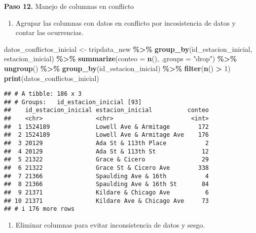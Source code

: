 \documentclass[
]{article}
\newenvironment{Shaded}{\begin{snugshade}}{\end{snugshade}}
\newcommand{\AttributeTok}[1]{\textcolor[rgb]{0.13,0.29,0.53}{#1}}
\newcommand{\DecValTok}[1]{\textcolor[rgb]{0.00,0.00,0.81}{#1}}
\newcommand{\FunctionTok}[1]{\textcolor[rgb]{0.13,0.29,0.53}{\textbf{#1}}}
\newcommand{\NormalTok}[1]{#1}
\newcommand{\OtherTok}[1]{\textcolor[rgb]{0.56,0.35,0.01}{#1}}
\newcommand{\SpecialCharTok}[1]{\textcolor[rgb]{0.81,0.36,0.00}{\textbf{#1}}}
\newcommand{\StringTok}[1]{\textcolor[rgb]{0.31,0.60,0.02}{#1}}
\providecommand{\tightlist}{%
  \setlength{\itemsep}{0pt}\setlength{\parskip}{0pt}}
\begin{document}
\hfill\break
\textbf{Paso 12.} Manejo de columnas en conflicto

\begin{enumerate}
\def\labelenumi{\arabic{enumi}.}
\tightlist
\item
  Agrupar las columnas con datos en conflicto por incosistencia de datos
  y contar las ocurrencias.
\end{enumerate}

\begin{Shaded}
\begin{Highlighting}[]
\NormalTok{    datos\_conflictos\_inicial }\OtherTok{\textless{}{-}}\NormalTok{ tripdata\_new }\SpecialCharTok{\%\textgreater{}\%}
      \FunctionTok{group\_by}\NormalTok{(id\_estacion\_inicial, estacion\_inicial) }\SpecialCharTok{\%\textgreater{}\%}
      \FunctionTok{summarize}\NormalTok{(}\AttributeTok{conteo =} \FunctionTok{n}\NormalTok{(), }\AttributeTok{.groups =} \StringTok{"drop"}\NormalTok{) }\SpecialCharTok{\%\textgreater{}\%}
      \FunctionTok{ungroup}\NormalTok{() }\SpecialCharTok{\%\textgreater{}\%} \FunctionTok{group\_by}\NormalTok{(id\_estacion\_inicial) }\SpecialCharTok{\%\textgreater{}\%}
      \FunctionTok{filter}\NormalTok{(}\FunctionTok{n}\NormalTok{() }\SpecialCharTok{\textgreater{}} \DecValTok{1}\NormalTok{) }
    \FunctionTok{print}\NormalTok{(datos\_conflictos\_inicial)}
\end{Highlighting}
\end{Shaded}

\begin{verbatim}
## # A tibble: 186 x 3
## # Groups:   id_estacion_inicial [93]
##    id_estacion_inicial estacion_inicial          conteo
##    <chr>               <chr>                      <int>
##  1 1524189             Lowell Ave & Armitage        172
##  2 1524189             Lowell Ave & Armitage Ave    176
##  3 20129               Ada St & 113th Place           2
##  4 20129               Ada St & 113th St             12
##  5 21322               Grace & Cicero                29
##  6 21322               Grace St & Cicero Ave        338
##  7 21366               Spaulding Ave & 16th           4
##  8 21366               Spaulding Ave & 16th St       84
##  9 21371               Kildare & Chicago Ave          6
## 10 21371               Kildare Ave & Chicago Ave     73
## # i 176 more rows
\end{verbatim}

\begin{enumerate}
\def\labelenumi{\arabic{enumi}.}
\setcounter{enumi}{1}
\tightlist
\item
  Eliminar columnas para evitar inconsistencia de datos y sesgo.
\end{enumerate}
\end{document}
